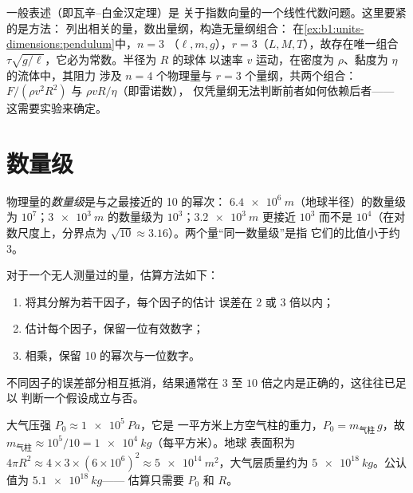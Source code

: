\begin{remark}[命题的应用]\label{rem:b1:units-dimensions:pi}
一般表述（即瓦辛–白金汉定理）是
关于指数向量的一个线性代数问题。这里要紧的是方法：
列出相关的量，数出量纲，构造无量纲组合：
在\cref{ex:b1:units-dimensions:pendulum}中，$n = 3$
（$\ell, m, g$），$r = 3$（$L, M, T$），故存在唯一组合
$\tau\sqrt{g/\ell}$，它必为常数。半径为 $R$ 的球体
以速率 $v$ 运动，在密度为 $\rho$、黏度为 $\eta$ 的流体中，其阻力
涉及 $n = 4$ 个物理量与 $r = 3$ 个量纲，共两个组合：
$F/(\rho v^2 R^2)$ 与 $\rho v R/\eta$（即雷诺数），
仅凭量纲无法判断前者如何依赖后者——
这需要实验来确定。
\end{remark}

\section{数量级}

\begin{definition}[数量级]\label{def:b1:units-dimensions:oom}
物理量的\emph{数量级}是与之最接近的 10 的幂次：
$\qty{6.4e6}{m}$（地球半径）的数量级为
$10^7$；$\qty{3e3}{m}$ 的数量级为 $10^3$；$\qty{3.2e3}{m}$ 更接近
$10^3$ 而不是 $10^4$（在对数尺度上，分界点为
$\sqrt{10} \approx 3.16$）。两个量“同一数量级”是指
它们的比值小于约 $3$。
\end{definition}

\begin{method}[估算]\label{met:b1:units-dimensions:estimate}
对于一个无人测量过的量，估算方法如下：
\begin{enumerate}
  \item 将其分解为若干因子，每个因子的估计
        误差在 $2$ 或 $3$ 倍以内；
  \item 估计每个因子，保留一位有效数字；
  \item 相乘，保留 10 的幂次与一位数字。
\end{enumerate}
不同因子的误差部分相互抵消，结果通常在
$3$ 至 $10$ 倍之内是正确的，这往往已足以
判断一个假设成立与否。
\end{method}

\begin{example}[大气层的质量]\label{ex:b1:units-dimensions:atmosphere}
大气压强 $P_0 \approx \qty{1e5}{Pa}$，它是
一平方米上方空气柱的重力，$P_0 = m_{\text{气柱}}\,g$，故
$m_{\text{气柱}} \approx 10^5/10 = \qty{1e4}{kg}$（每平方米）。地球
表面积为 $4\pi R^2 \approx 4 \times 3 \times (6\times10^6)^2
\approx \qty{5e14}{m^2}$，大气层质量约为
$\qty{5e18}{kg}$。公认值为 $\qty{5.1e18}{kg}$——
估算只需要 $P_0$ 和 $R$。
\end{example}

